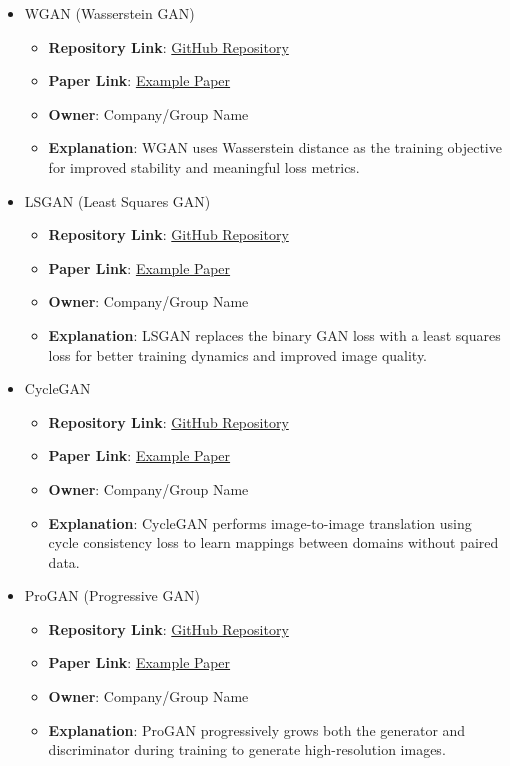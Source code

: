 \documentclass{article}
\begin{document}
{\begin{itemize}
\begin{itemize}
      \item \textbf{Owner}: Company/Group Name
      \item \textbf{Explanation}: CGAN incorporates conditional information into the GAN framework for controlled generation.
    \end{itemize}
  \item WGAN (Wasserstein GAN)
    \begin{itemize}
      \item \textbf{Repository Link}: \href{https://github.com/username/wgan}{GitHub Repository}
      \item \textbf{Paper Link}: \href{https://arxiv.org/abs/6789.0123}{Example Paper}
      \item \textbf{Owner}: Company/Group Name
      \item \textbf{Explanation}: WGAN uses Wasserstein distance as the training objective for improved stability and meaningful loss metrics.
    \end{itemize}
  \item LSGAN (Least Squares GAN)
    \begin{itemize}
      \item \textbf{Repository Link}: \href{https://github.com/username/lsgan}{GitHub Repository}
      \item \textbf{Paper Link}: \href{https://arxiv.org/abs/3456.7890}{Example Paper}
      \item \textbf{Owner}: Company/Group Name
      \item \textbf{Explanation}: LSGAN replaces the binary GAN loss with a least squares loss for better training dynamics and improved image quality.
    \end{itemize}
  \item CycleGAN
    \begin{itemize}
      \item \textbf{Repository Link}: \href{https://github.com/username/cyclegan}{GitHub Repository}
      \item \textbf{Paper Link}: \href{https://arxiv.org/abs/9012.3456}{Example Paper}
      \item \textbf{Owner}: Company/Group Name
      \item \textbf{Explanation}: CycleGAN performs image-to-image translation using cycle consistency loss to learn mappings between domains without paired data.
    \end{itemize}
  \item ProGAN (Progressive GAN)
    \begin{itemize}
      \item \textbf{Repository Link}: \href{https://github.com/username/progan}{GitHub Repository}
      \item \textbf{Paper Link}: \href{https://arxiv.org/abs/6789.0123}{Example Paper}
      \item \textbf{Owner}: Company/Group Name
      \item \textbf{Explanation}: ProGAN progressively grows both the generator and discriminator during training to generate high-resolution images.
    \end{itemize}
\end{itemize}

}
\end{document}
